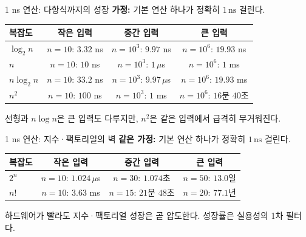 \begin{frame}{1 ns 연산: 다항식까지의 성장}
  \textbf{가정:} 기본 연산 하나가 정확히 $1\,\mathrm{ns}$ 걸린다.\par\medskip
  \renewcommand{\arraystretch}{1.30}
  \begin{tabular}{@{}lccc@{}}
    \toprule
    복잡도 & 작은 입력 & 중간 입력 & 큰 입력 \\
    \midrule
    $\log_2 n$ & $n=10$: $3.32$ ns & $n=10^3$: $9.97$ ns & $n=10^6$: $19.93$ ns \\
    $n$ & $n=10$: $10$ ns & $n=10^3$: $1\,\mu$s & $n=10^6$: $1$ ms \\
    $n\log_2 n$ & $n=10$: $33.2$ ns & $n=10^3$: $9.97\,\mu$s & $n=10^6$: $19.93$ ms \\
    $n^2$ & $n=10$: $100$ ns & $n=10^3$: $1$ ms
      & $n=10^6$: \alert{$16$분 $40$초} \\
    \bottomrule
  \end{tabular}
  \vfill
  \begin{takeaway}
    선형과 $n\log n$은 큰 입력도 다루지만, $n^2$은 같은 입력에서 급격히 무거워진다.
  \end{takeaway}
\end{frame}

\begin{frame}{1 ns 연산: 지수·팩토리얼의 벽}
  \textbf{같은 가정:} 기본 연산 하나가 정확히 $1\,\mathrm{ns}$ 걸린다.\par\medskip
  \renewcommand{\arraystretch}{1.45}
  \begin{tabular}{@{}lccc@{}}
    \toprule
    복잡도 & 작은 입력 & 중간 입력 & 큰 입력 \\
    \midrule
    $2^n$ & $n=10$: $1.024\,\mu$s
      & $n=30$: \alert{$1.074$초}
      & $n=50$: \alert{$13.0$일} \\
    $n!$ & $n=10$: $3.63$ ms
      & $n=15$: \alert{$21$분 $48$초}
      & $n=20$: \alert{$77.1$년} \\
    \bottomrule
  \end{tabular}
  \vfill
  \begin{takeaway}
    하드웨어가 빨라도 지수·팩토리얼 성장은 곧 압도한다. 성장률은 실용성의 1차 필터다.
  \end{takeaway}
\end{frame}
